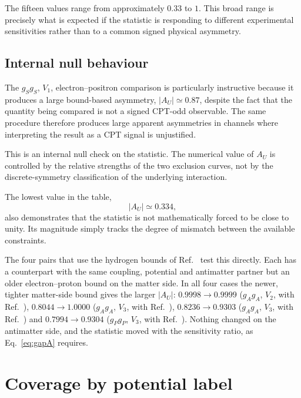\documentclass[aps,prd,reprint,superscriptaddress,nofootinbib]{revtex4-2}
\begin{document}
	The fifteen values range from approximately $0.33$ to $1$. This broad
	range is precisely what is expected if the statistic is responding to
	different experimental sensitivities rather than to a common signed
	physical asymmetry.
	
	\subsection{Internal null behaviour}
	
	The $g_Sg_S$, $V_1$, electron--positron comparison is particularly
	instructive because it produces a large bound-based asymmetry,
	$|A_U|\simeq0.87$, despite the fact that the quantity being compared is
	not a signed CPT-odd observable. The same procedure therefore produces
	large apparent asymmetries in channels where interpreting the result as
	a CPT signal is unjustified.
	
	This is an internal null check on the statistic. The numerical value of
	$A_U$ is controlled by the relative strengths of the two exclusion
	curves, not by the discrete-symmetry classification of the underlying
	interaction.
	
	The lowest value in the table,
	\begin{equation}
		|A_U|\simeq0.334,
	\end{equation}
	also demonstrates that the statistic is not mathematically forced to
be close to unity. Its magnitude simply tracks the degree of mismatch
between the available constraints.

The four pairs that use the hydrogen bounds of Ref.~\cite{Cong2025b}
test this directly. Each has a counterpart with the same coupling,
potential and antimatter partner but an older electron--proton bound on
the matter side. In all four cases the newer, tighter matter-side bound
gives the larger $|A_U|$: $0.9998\to0.9999$ ($g_Ag_A$, $V_2$, with
Ref.~\cite{Ficek2018}), $0.8044\to1.0000$ ($g_Ag_A$, $V_3$, with
Ref.~\cite{Fadeev2022}), $0.8236\to0.9303$ ($g_Ag_A$, $V_3$, with
Ref.~\cite{Ficek2018}) and $0.7994\to0.9304$ ($g_Pg_P$, $V_3$, with
Ref.~\cite{Ficek2018}). Nothing changed on the antimatter side, and the
statistic moved with the sensitivity ratio, as Eq.~\eqref{eq:gapA}
requires.
	
	\section{Coverage by potential label}
	
\end{document}
